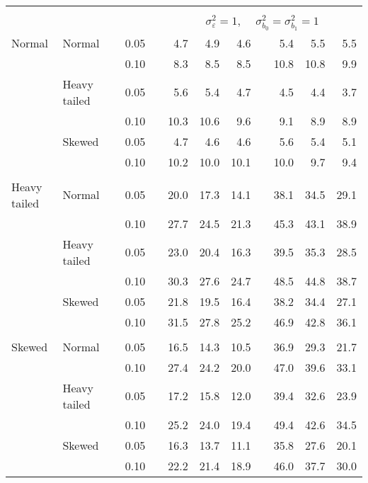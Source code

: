 \begin{table}[ht]
\begin{scriptsize}
\begin{tabular}{ll p{.1cm} c p{.1cm} rrr p{.1cm} rrr}
&&&&&&&&&&&\\
& && && \multicolumn{7}{c}{$\sigma_{\varepsilon}^2 = 1$, \ \ $\sigma_{b_0}^2 = \sigma_{b_1}^2 = 1$} \\ \cline{6-12}
\rowcolor{gray!20} Normal & Normal &  & 0.05 &  & 4.7 & 4.9 & 4.6 &  & 5.4 & 5.5 & 5.5 \\ 
\rowcolor{gray!20}    &  &  & 0.10 &  & 8.3 & 8.5 & 8.5 &  & 10.8 & 10.8 & 9.9 \\ 
\rowcolor{gray!20}    & Heavy tailed &  & 0.05 &  & 5.6 & 5.4 & 4.7 &  & 4.5 & 4.4 & 3.7 \\ 
\rowcolor{gray!20}    &  &  & 0.10 &  & 10.3 & 10.6 & 9.6 &  & 9.1 & 8.9 & 8.9 \\ 
\rowcolor{gray!20}    & Skewed &  & 0.05 &  & 4.7 & 4.6 & 4.6 &  & 5.6 & 5.4 & 5.1 \\ 
\rowcolor{gray!20}    &  &  & 0.10 &  & 10.2 & 10.0 & 10.1 &  & 10.0 & 9.7 & 9.4 \\ 
&&&&&&&&&&&\\
  Heavy tailed & Normal &  & 0.05 &  & 20.0 & 17.3 & 14.1 &  & 38.1 & 34.5 & 29.1 \\ 
   &  &  & 0.10 &  & 27.7 & 24.5 & 21.3 &  & 45.3 & 43.1 & 38.9 \\ 
   & Heavy tailed &  & 0.05 &  & 23.0 & 20.4 & 16.3 &  & 39.5 & 35.3 & 28.5 \\ 
   &  &  & 0.10 &  & 30.3 & 27.6 & 24.7 &  & 48.5 & 44.8 & 38.7 \\ 
   & Skewed &  & 0.05 &  & 21.8 & 19.5 & 16.4 &  & 38.2 & 34.4 & 27.1 \\ 
   &  &  & 0.10 &  & 31.5 & 27.8 & 25.2 &  & 46.9 & 42.8 & 36.1 \\ 
&&&&&&&&&&&\\
  Skewed & Normal &  & 0.05 &  & 16.5 & 14.3 & 10.5 &  & 36.9 & 29.3 & 21.7 \\ 
   &  &  & 0.10 &  & 27.4 & 24.2 & 20.0 &  & 47.0 & 39.6 & 33.1 \\ 
   & Heavy tailed &  & 0.05 &  & 17.2 & 15.8 & 12.0 &  & 39.4 & 32.6 & 23.9 \\ 
   & &  & 0.10 &  & 25.2 & 24.0 & 19.4 &  & 49.4 & 42.6 & 34.5 \\ 
   & Skewed &  & 0.05 &  & 16.3 & 13.7 & 11.1 &  & 35.8 & 27.6 & 20.1 \\ 
   &  &  & 0.10 &  & 22.2 & 21.4 & 18.9 &  & 46.0 & 37.7 & 30.0 \\ 



\end{tabular}
\end{scriptsize}
\end{table}
